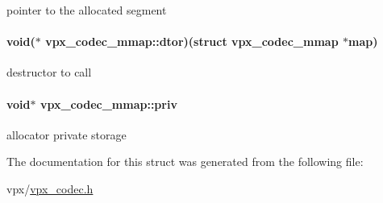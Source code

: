 \label{structvpx__codec__mmap_a0f7580ef4f5680df53c1ef3bd5f66d01}
pointer to the allocated segment \hypertarget{structvpx__codec__mmap_a39476b4d60e41d0867e0966f09dc1e45}{
\paragraph[{dtor}]{\setlength{\rightskip}{0pt plus 5cm}void($\ast$ {\bf vpx\-\_\-codec\-\_\-mmap\-::dtor})(struct {\bf vpx\-\_\-codec\-\_\-mmap} $\ast$map)}}
\label{structvpx__codec__mmap_a39476b4d60e41d0867e0966f09dc1e45}
destructor to call \hypertarget{structvpx__codec__mmap_ac2be21bb5e6d94332fff9c5f1263224f}{
\paragraph[{priv}]{\setlength{\rightskip}{0pt plus 5cm}void$\ast$ {\bf vpx\-\_\-codec\-\_\-mmap\-::priv}}}
\label{structvpx__codec__mmap_ac2be21bb5e6d94332fff9c5f1263224f}
allocator private storage 

\-The documentation for this struct was generated from the following file\-:\begin{DoxyCompactItemize}
\item 
vpx/\hyperlink{vpx__codec_8h}{vpx\-\_\-codec.\-h}\end{DoxyCompactItemize}
